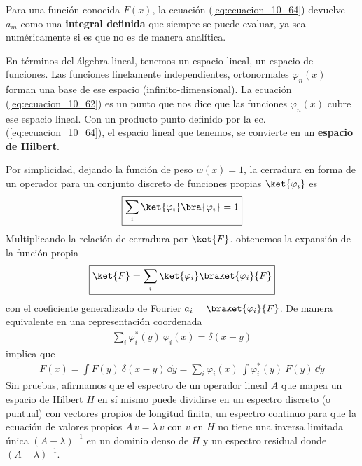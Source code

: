 \par
Para una función conocida $F(x)$, la ecuación (\ref{eq:ecuacion_10_64}) devuelve $a_{m}$ como una \textbf{integral definida} que siempre se puede evaluar, ya sea numéricamente si es que no es de manera analítica.
\par
En términos del álgebra lineal, tenemos un espacio lineal, un espacio de funciones. Las funciones linelamente independientes, ortonormales $\varphi_{n}(x)$ forman una base de ese espacio (infinito-dimensional). La ecuación (\ref{eq:ecuacion_10_62}) es un punto que nos dice que las funciones $\varphi_{n}(x)$ cubre ese espacio lineal. Con un producto punto definido por la ec. (\ref{eq:ecuacion_10_64}), el espacio lineal que tenemos, se convierte en un \textbf{espacio de Hilbert}.
\par
Por simplicidad, dejando la función de peso $w(x)=1$, la cerradura en forma de un operador para un conjunto discreto de funciones propias $\ket{\varphi_{i}}$ es
\begin{align*}
\boxed{\sum_{i} \ket{\varphi_{i}} \bra{\varphi_{i}} =  1}
\end{align*}
Multiplicando la relación de cerradura por $\ket{F}$. obtenemos la expansión de la función propia
\begin{align*}
\boxed{\ket{F} = \sum_{i} \ket{\varphi_{i}} \braket{\varphi_{i}}{F}}
\end{align*}
con el coeficiente generalizado de Fourier $a_{i} = \braket{\varphi_{i}}{F}$. De manera equivalente en una representación coordenada
\begin{align*}
\boxed{\sum_{i} \varphi_{i}^{*} (y) \: \varphi_{i} (x) = \delta (x - y)}
\end{align*}
implica que
\begin{align*}
F(x) = \int F(y) \: \delta (x - y) \, \dd{y} = \sum_{i} \varphi_{i} (x) \: \int \varphi_{i}^{*} (y) \: F(y) \, \dd{y}
\end{align*}
Sin pruebas, afirmamos que el espectro de un operador lineal $A$ que mapea un espacio de Hilbert $H$ en sí mismo puede dividirse en un espectro discreto (o puntual) con vectores propios de longitud finita, un espectro continuo para que la ecuación de valores propios $A \, v = \lambda \, v$ con $v$ en $H$ no tiene una inversa limitada única $(A - \lambda)^{-1}$ en un dominio denso de $H$ y un espectro residual donde $(A - \lambda)^{-1}$.

